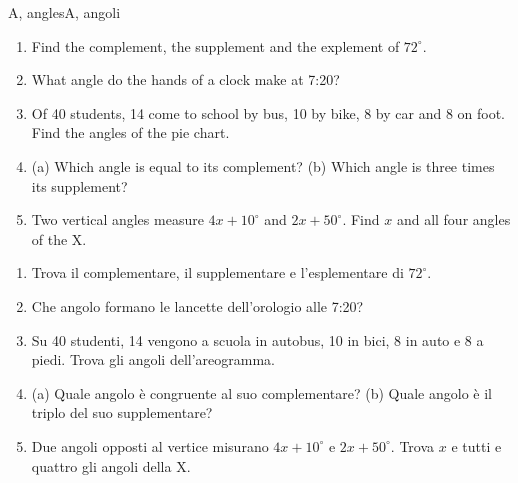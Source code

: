 \documentclass[10pt,a4paper,oneside]{book}
\begin{document}
\begin{exercise}{A, angles}{A, angoli}
\begin{enumerate}[label=\textbf{A\arabic*.}, leftmargin=2.2em]
\item Find the complement, the supplement and the explement of $72^\circ$.
\item What angle do the hands of a clock make at 7:20?
\item Of 40 students, 14 come to school by bus, 10 by bike, 8 by car and 8 on foot. Find the angles of the pie chart.
\item (a) Which angle is equal to its complement? (b) Which angle is three times its supplement?
\item Two vertical angles measure $4x + 10^\circ$ and $2x + 50^\circ$. Find $x$ and all four angles of the X.
\end{enumerate}
\tcblower
\begin{enumerate}[label=\textbf{A\arabic*.}, leftmargin=2.2em]
\item Trova il complementare, il supplementare e l'esplementare di $72^\circ$.
\item Che angolo formano le lancette dell'orologio alle 7:20?
\item Su 40 studenti, 14 vengono a scuola in autobus, 10 in bici, 8 in auto e 8 a piedi. Trova gli angoli dell'areogramma.
\item (a) Quale angolo è congruente al suo complementare? (b) Quale angolo è il triplo del suo supplementare?
\item Due angoli opposti al vertice misurano $4x + 10^\circ$ e $2x + 50^\circ$. Trova $x$ e tutti e quattro gli angoli della X.
\end{enumerate}
\end{exercise}
\end{document}
